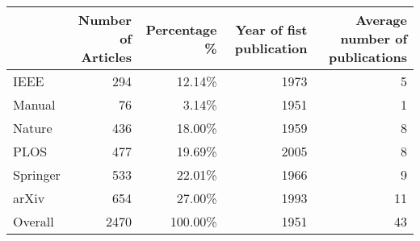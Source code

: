 \begin{tabular}{lrrrr}
\toprule
{} &  Number of Articles &  Percentage \% &  Year of fist publication &  Average number of publications\\
\midrule
IEEE     &               294 &       12.14\% &                    1973 &                             5\\
Manual   &                76 &        3.14\% &                    1951 &                             1\\
Nature   &               436 &       18.00\% &                    1959 &                             8\\
PLOS     &               477 &       19.69\% &                    2005 &                             8\\
Springer &               533 &       22.01\% &                    1966 &                             9\\
arXiv    &               654 &       27.00\% &                    1993 &                            11\\
Overall  &              2470 &      100.00\% &                    1951 &                            43\\
\bottomrule
\end{tabular}
